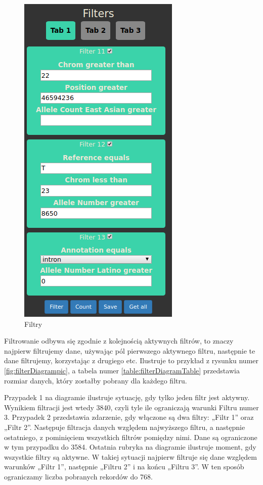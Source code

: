 \documentclass[a4paper,12pt,twoside]{article}
\begin{document}
\begin{figure}
\centering
\includegraphics[height=0.95\textheight]{obrazy/aplikacja/filters.png}
\caption{Filtry}
\label{fig:filterspic}
\end{figure}

\newpage

Filtrowanie odbywa się zgodnie z kolejnością aktywnych filtrów, to znaczy najpierw filtrujemy dane, używając pól pierwszego aktywnego filtru, następnie te dane filtrujemy, korzystając z drugiego etc. Ilustruje to przykład z rysunku numer \ref{fig:filterDiagrampic}, a tabela numer \ref{table:filterDiagramTable}
przedstawia rozmiar danych, który zostałby pobrany dla każdego filtru.

Przypadek 1 na diagramie ilustruje sytuację, gdy tylko jeden filtr jest aktywny.
Wynikiem filtracji jest wtedy 3840, czyli tyle ile ograniczają warunki Filtru numer 3.
Przypadek 2 przedstawia zdarzenie, gdy włączone są dwa filtry: „Filtr 1” oraz „Filtr 2”. Następuje filtracja danych względem najwyższego filtru, a następnie ostatniego,
z pominięciem wszystkich filtrów pomiędzy nimi.
Dane są ograniczone w tym przypadku do 3584.
Ostatnia rubryka na diagramie ilustruje moment, gdy wszystkie filtry są aktywne.
W takiej sytuacji najpierw filtruje się dane względem warunków „Filtr 1”,
następnie „Filtru 2” i na końcu „Filtru 3”. W ten sposób ograniczamy
liczba pobranych rekordów do 768.
\end{document}
